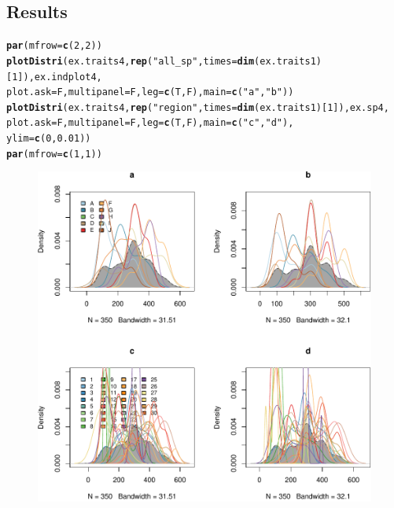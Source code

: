 \documentclass[12pt]{article}\usepackage[]{graphicx}\usepackage[]{color}
\makeatletter
\def\maxwidth{ %
  \ifdim\Gin@nat@width>\linewidth
    \linewidth
  \else
    \Gin@nat@width
  \fi
}
\newcommand{\hlnum}[1]{\textcolor[rgb]{0.686,0.059,0.569}{#1}}%
\newcommand{\hlstr}[1]{\textcolor[rgb]{0.192,0.494,0.8}{#1}}%
\newcommand{\hlstd}[1]{\textcolor[rgb]{0.345,0.345,0.345}{#1}}%
\newcommand{\hlkwc}[1]{\textcolor[rgb]{0.333,0.667,0.333}{#1}}%
\newcommand{\hlkwd}[1]{\textcolor[rgb]{0.737,0.353,0.396}{\textbf{#1}}}%
\newenvironment{kframe}{%
 \def\at@end@of@kframe{}%
 \ifinner\ifhmode%
  \def\at@end@of@kframe{\end{minipage}}%
  \begin{minipage}{\columnwidth}%
 \fi\fi%
 \def\FrameCommand##1{\hskip\@totalleftmargin \hskip-\fboxsep
 \colorbox{shadecolor}{##1}\hskip-\fboxsep
     \hskip-\linewidth \hskip-\@totalleftmargin \hskip\columnwidth}%
 \MakeFramed {\advance\hsize-\width
   \@totalleftmargin\z@ \linewidth\hsize
   \@setminipage}}%
 {\par\unskip\endMakeFramed%
 \at@end@of@kframe}
\newenvironment{knitrout}{}{} %
\makeatother
\begin{document}
  \subsection{Results}
\begin{knitrout}\small
{}\color{fgcolor}\begin{kframe}
\begin{alltt}
\hlkwd{par}\hlstd{(}\hlkwc{mfrow}\hlstd{=}\hlkwd{c}\hlstd{(}\hlnum{2}\hlstd{,} \hlnum{2}\hlstd{))}
\hlkwd{plotDistri}\hlstd{(ex.traits4,} \hlkwd{rep}\hlstd{(}\hlstr{"all_sp"}\hlstd{,} \hlkwc{times} \hlstd{=} \hlkwd{dim}\hlstd{(ex.traits1)[}\hlnum{1}\hlstd{]), ex.indplot4,}
           \hlkwc{plot.ask} \hlstd{= F,} \hlkwc{multipanel} \hlstd{= F,} \hlkwc{leg} \hlstd{=}\hlkwd{c}\hlstd{(T, F),} \hlkwc{main} \hlstd{=} \hlkwd{c}\hlstd{(}\hlstr{"a"}\hlstd{,} \hlstr{"b"}\hlstd{))}
\hlkwd{plotDistri}\hlstd{(ex.traits4,} \hlkwd{rep}\hlstd{(}\hlstr{"region"}\hlstd{,} \hlkwc{times} \hlstd{=} \hlkwd{dim}\hlstd{(ex.traits1)[}\hlnum{1}\hlstd{]), ex.sp4,}
           \hlkwc{plot.ask} \hlstd{= F,} \hlkwc{multipanel} \hlstd{= F,} \hlkwc{leg} \hlstd{=}\hlkwd{c}\hlstd{(T, F),} \hlkwc{main} \hlstd{=} \hlkwd{c}\hlstd{(}\hlstr{"c"}\hlstd{,} \hlstr{"d"}\hlstd{),}
           \hlkwc{ylim} \hlstd{=} \hlkwd{c}\hlstd{(}\hlnum{0}\hlstd{,} \hlnum{0.01}\hlstd{))}
\hlkwd{par}\hlstd{(}\hlkwc{mfrow}\hlstd{=}\hlkwd{c}\hlstd{(}\hlnum{1}\hlstd{,} \hlnum{1}\hlstd{))}
\end{alltt}
\end{kframe}\begin{figure}

{\centering \includegraphics[width=\maxwidth]{figure/InEx_Filter_plots-1} 

}
\end{figure}
\end{knitrout}
\end{document}
